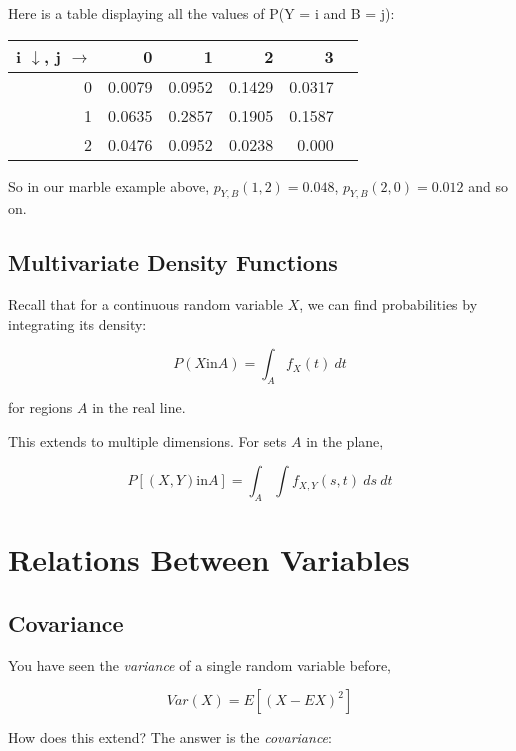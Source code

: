 Here is a table displaying all the values of P(Y = i and B = j):

\begin{tabular}{|r|r|r|r|r|r|}
\hline
i $\downarrow$, j $\rightarrow$ & 0 & 1 & 2 & 3 \\ \hline
0 & 0.0079 & 0.0952 & 0.1429 & 0.0317 \\ \hline
1 & 0.0635 & 0.2857 & 0.1905 & 0.1587 \\ \hline
2 & 0.0476 & 0.0952 & 0.0238 & 0.000 \\ \hline
\end{tabular}

So in our marble example above, $p_{Y,B}(1,2) = 0.048$, $p_{Y,B}(2,0) =
0.012$ and so on.

\subsection{Multivariate Density Functions}

Recall that for a continuous random variable $X$, we can find
probabilities by integrating its density:

\begin{equation}
P(X \textrm{in} A) = \int_{A} f_X(t) ~ dt
\end{equation}

for regions $A$ in the real line.

This extends to multiple dimensions.  For sets $A$ in the plane,

\begin{equation}
P[(X,Y) \textrm{in} A] = \int_{A} \int f_{X,Y}(s,t) ~ ds  ~ dt
\end{equation}

\section{Relations Between Variables}

\subsection{Covariance}

You have seen the \textit{variance} of a single random variable before,

\begin{equation}
Var(X) = E[(X - EX)^2]
\end{equation}

How does this extend?  The answer is the \textit{covariance}:

